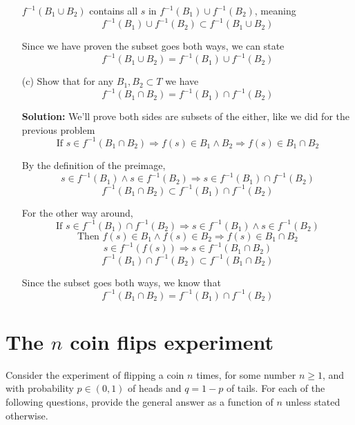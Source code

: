 \documentclass[hidelinks]{article}
\begin{document}
\begin{itemize}
          $f^{-1}(B_1 \cup B_2)$ contains all $s$ in  $f^{-1}(B_1) \cup f^{-1}(B_2)$, meaning 
        \[
          f^{-1}(B_1) \cup f^{-1}(B_2) \subset f^{-1}(B_1 \cup B_2)  
        \]
    \item[ ] Since we have proven the subset goes both ways, we can state 
$$f^{-1}(B_1 \cup B_2)=f^{-1}(B_1) \cup f^{-1}(B_2)$$ 



    \item[(c)] Show that for any $B_1,B_2 \subset T$ we have $$f^{-1}(B_1 \cap B_2)=f^{-1}(B_1)\cap f^{-1}(B_2)$$
    \item[ ] \textbf{Solution:}
        We'll prove both sides are subsets of the either, like we did for the previous problem 
    \[
        \text{If } s \in f^{-1}(B_1 \cap B_2) \Rightarrow f(s) \in B_1 \wedge B_2
        \Rightarrow f(s) \in B_1 \cap B_2
    \]
    \item[ ] By the definition of the preimage, 
    \[
        s \in f^{-1}(B_1) \wedge s \in f^{-1}(B_2) \Rightarrow s \in  f^{-1}(B_1) \cap f^{-1}(B_2) 
    \]
    \[
        f^{-1}(B_1 \cap B_2) \subset f^{-1}(B_1) \cap f^{-1}(B_2)
    \]
    \item[ ] For the other way around, 
    \[
        \text{If } s \in f^{-1}(B_1) \cap f^{-1}(B_2) \Rightarrow s \in f^{-1}(B_1) \wedge s \in f^{-1}(B_2) 
    \]
    \[
        \text{Then } f(s) \in B_1 \wedge f(s) \in B_2 \Rightarrow f(s) \in B_1 \cap B_2 
    \]
    \[
        s \in f^{-1}(f(s)) \Rightarrow s \in f^{-1}(B_1 \cap B_2)
    \]
    \[
        f^{-1}(B_1) \cap f^{-1}(B_2) \subset  f^{-1}(B_1 \cap B_2) 
    \]
    \item[ ] Since the subset goes both ways, we know that 
    $$f^{-1}(B_1 \cap B_2)=f^{-1}(B_1)\cap f^{-1}(B_2)$$












\end{itemize}
\newpage

\section*{The $n$ coin flips experiment}
Consider the experiment of flipping a coin $n$ times, for some number $n \geq 1$, and with probability $p \in (0,1)$ of heads and $q = 1-p$ of tails. For each of the following questions, provide the general answer as a function of $n$ unless stated otherwise.
\end{document}
